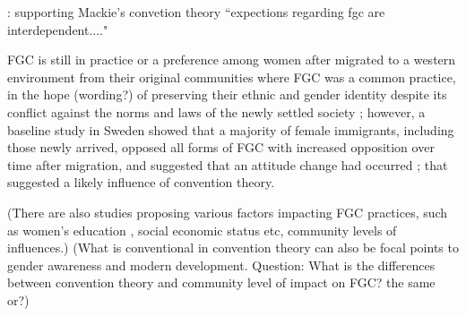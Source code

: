 \documentclass[12pt,]{article}
\begin{document}

 \cite{Shel-Wand11}:  supporting Mackie's convetion theory ``expections regarding fgc are interdependent...."




FGC is still in practice or a preference among women after migrated to a western environment from their original communities where FGC was a common practice, in the hope (wording?) of preserving their ethnic and gender identity despite its conflict against the  norms and laws of the newly settled society \cite{}; however, a baseline study in Sweden showed that a majority of female immigrants, including those newly arrived, opposed all forms of FGC with increased opposition over time after migration, and suggested that an attitude change had occurred \cite{WahlJohn17}; that suggested a likely influence of convention theory.


(There are also studies proposing various factors impacting FGC practices, such as women's education \cite{KandNwak09,VanMeek15}, social economic status \cite{} etc, community levels of influences.) (What is conventional in convention theory can also be focal points to gender awareness and modern development.  Question:  What is the differences between convention theory and community level of impact on FGC? the same or?)  



\end{document}
